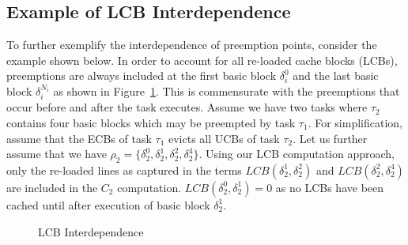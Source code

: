 \subsection {Example of LCB Interdependence}\label{sec:example_lcb_interdependence}
\indent
To further exemplify the interdependence of preemption points, consider the example shown below.  In order to account for all re-loaded cache blocks (LCBs), preemptions are always included at the first basic block  ${\delta_i^{0}}$ and the last basic block ${\delta_i^{N_i}}$ as shown in Figure~\ref{fig:test_02}.  This is commensurate with the preemptions that occur before and after the task executes.  Assume we have two tasks where ${\tau_2}$ contains four basic blocks which may be preempted by task ${\tau_1}$.  For simplification, assume that the ECBs of task ${\tau_1}$ evicts all UCBs of task ${\tau_2}$.  Let us further assume that we have ${\rho_2 = \{\delta_2^0, \delta_2^1, \delta_2^2, \delta_2^4\}}$.  Using our LCB computation approach, only the re-loaded lines as captured in the terms ${LCB(\delta_2^1, \delta_2^2)}$ and ${LCB(\delta_2^2, \delta_2^4)}$ are included in the ${C_2}$ computation.  ${LCB(\delta_2^0, \delta_2^1)} = 0$ as no LCBs have been cached until after execution of basic block $\delta_2^1$.
%
%  
%

\begin{figure}[!htb]
  \centering
  \def\svgwidth{250pt}
  
  \vspace{5pt}
  \caption{LCB Interdependence}
  \label{fig:test_02}
\end{figure}

%
%
